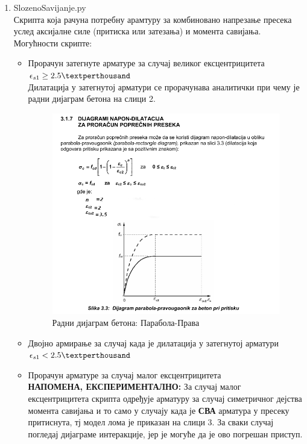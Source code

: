 \documentclass[11pt, a4paper]{article}
\begin{document}
\begin{enumerate}

	\item {\LARGE SlozenoSavijanje.py}\\ [5mm]
	Скрипта која рачуна потребну арамтуру за комбиновано напрезање пресека услед аксијалне силе (притиска или затезања) и момента савијања.\\
	Могућности скрипте:
	\begin{itemize}
		
		\item Прорачун затегнуте арматуре за случај великог ексцентрицитета $\epsilon_{s1} \geq  2.5 \textperthousand$\\[2mm]
		Дилатација у затегнутој арматури се прорачунава аналитички при чему је радни дијаграм бетона на слици 2.
		\begin{figure}[h]
			\includegraphics[width=100mm, scale=1, center]{RDB.png}
			\caption{ Радни дијаграм бетона: Парабола-Права}
		\end{figure}
		\item Двојно армирање за случај када је дилатација у затегнутој арматури $\epsilon_{s1} <  2.5 \textperthousand$
		
		\item Прорачун арматуре за случај малог ексцентрицитета\\[2mm]
	\textbf{НАПОМЕНА, ЕКСПЕРИМЕНТАЛНО:} За случај малог ексцентрицитета скрипта одређује арматуру за случај симетричног дејства момента савијања и то само у случају када је \textbf{СВА} арматура у пресеку притиснута, тј модел лома је приказан на слици 3. За сваки случај погледај дијаграме интеракције, јер је могуће да је ово погрешан приступ.
	

\end{itemize}
\end{enumerate}
\end{document}
